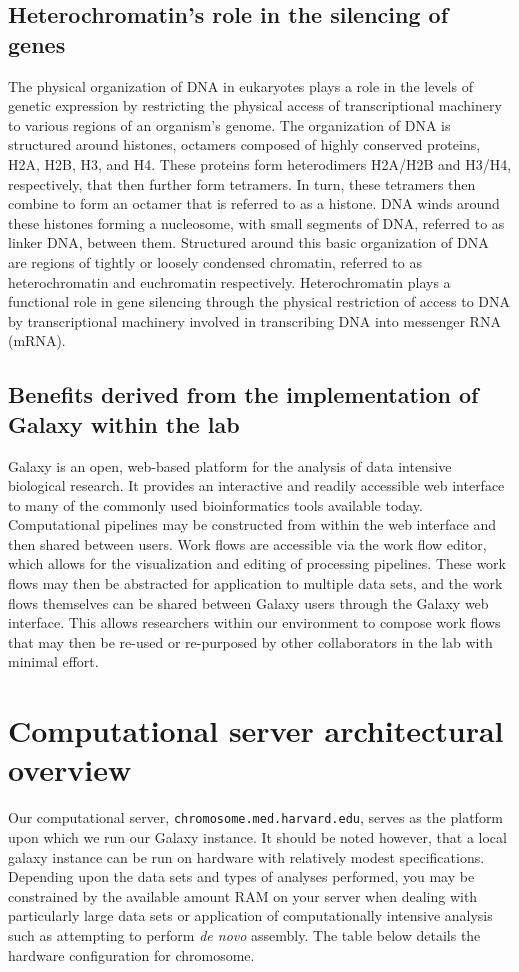\documentclass[a4paper,10pt]{article}
\begin{document}
\subsection{Heterochromatin's role in the silencing of genes}
The physical organization of DNA in eukaryotes plays a role in the levels of genetic expression by restricting the physical access of transcriptional machinery to various regions of an organism's genome.  The organization of DNA is structured around histones, octamers composed of highly conserved proteins, H2A, H2B, H3, and H4.  These proteins form heterodimers H2A/H2B and H3/H4, respectively, that then further form tetramers.  In turn, these tetramers then combine to form an octamer that is referred to as a histone.  DNA winds around these histones forming a nucleosome, with small segments of DNA, referred to as linker DNA, between them.  Structured around this basic organization of DNA are regions of tightly or loosely condensed chromatin, referred to as heterochromatin and euchromatin respectively.  Heterochromatin plays a functional role in gene silencing through the physical restriction of access to DNA by transcriptional machinery involved in transcribing DNA into messenger RNA (mRNA).

\subsection{Benefits derived from the implementation of Galaxy within the lab}
Galaxy is an open, web-based platform for the analysis of data intensive biological research.  It provides an interactive and readily accessible web interface to many of the commonly used bioinformatics tools available today.  Computational pipelines may be constructed from within the web interface and then shared between users.  Work flows are accessible via the work flow editor, which allows for the visualization and editing of processing pipelines.  These work flows may then be abstracted for application to multiple data sets, and the work flows themselves can be shared between Galaxy users through the Galaxy web interface.  This allows researchers within our environment to compose work flows that may then be re-used or re-purposed by other collaborators in the lab with minimal effort.

\section{Computational server architectural overview}
Our computational server, \texttt{\footnotesize{chromosome.med.harvard.edu}}, serves as the platform upon which we run our Galaxy instance.  It should be noted however, that a local galaxy instance can be run on hardware with relatively modest specifications.  Depending upon the data sets and types of analyses performed, you may be constrained by the available amount RAM on your server when dealing with particularly large data sets or application of computationally intensive analysis such as attempting to perform \textit{de novo} assembly.  The table below details the hardware configuration for chromosome.
\end{document}
